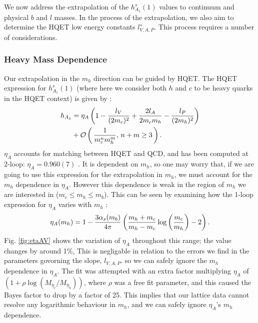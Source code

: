 We now address the extrapolation of the $h_{A_1}^s(1)$ values to continuum and physical $b$ and $l$ masses. In the process of the extrapolation, we also aim to determine the HQET low energy constants $l^s_{V,A,P}$. This process requires a number of considerations.

\subsubsection{Heavy Mass Dependence}
\label{sec:BsDsstar_heavymass}

Our extrapolation in the $m_h$ direction can be guided by HQET. The HQET expression for $h^s_{A_1}(1)$ (where here we consider both $h$ and $c$ to be heavy quarks in the HQET context) is given by \cite{Falk:1992wt,Mannel:1994kv}:
\begin{align}
  \label{eq:hqet}
  h_{A_1} &= \eta_A \left( 1 - {l_V\over (2m_c)^2} + {2l_A \over 2 m_c m_h} - { l_P \over (2m_h)^2 } \right)  \\ \nonumber &+ \mathcal{O}\left( \, {1\over m_c^n m_h^m}, \, n+m\geq 3 \, \right).
\end{align}
$\eta_A$ accounts for matching between HQET and QCD, and has been computed at 2-loop: $\eta_A = 0.960(7)$ \cite{PhysRevLett.76.4124}. It is dependent on $m_h$, so one may worry that, if we are going to use this expression for the extrapolation in $m_h$, we must account for the $m_h$ dependence in $\eta_A$. However this dependence is weak in the region of $m_h$ we are interested in ($m_c \leq m_h \leq m_b$). This can be seen by examining how the 1-loop expression for $\eta_A$ varies with $m_h$ \cite{PASCHALIS1983473}:
\begin{align}
  \eta_A(m_h) = 1 - {3 \alpha_s(m_b) \over 4\pi} \left( {m_h+m_c\over m_h-m_c} \log\left({m_c\over m_h}\right) - 2 \right).
\end{align}
Fig. \ref{fig:etaAV} shows the variation of $\eta_A$ throughout this range; the value changes by around 1\%, This is negligable in relation to the errors we find in the parameters govorning the slope, $l_{V,A,P}$. so we can safely ignore the $m_h$ dependence in $\eta_A$. The fit was attempted with an extra factor multiplying $\eta_A$ of $(1+\rho \log(M_{\eta_c}/M_{\eta_h}))$, where $\rho$ was a free fit parameter, and this caused the Bayes factor to drop by a factor of 25. This implies that our lattice data cannot resolve any logarithmic behaviour in $m_h$, and we can safely ignore $\eta_A$'s $m_h$ dependence.

